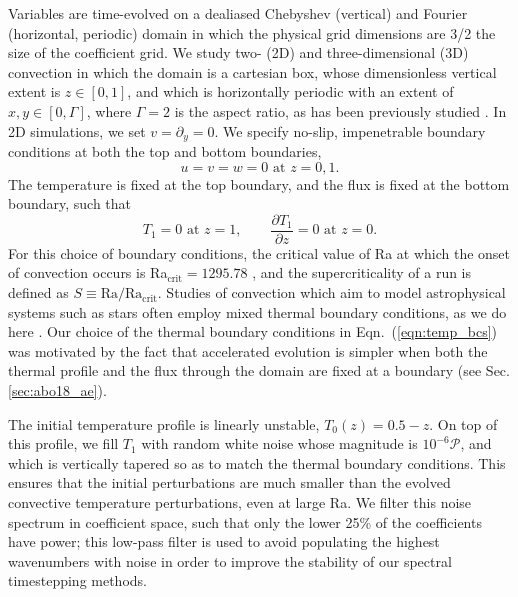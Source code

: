 Variables are time-evolved on a dealiased Chebyshev (vertical) and Fourier (horizontal, periodic) domain in which the physical grid dimensions are 3/2 the size of the coefficient grid.  
We study two- (2D) and three-dimensional (3D) convection in which the domain is a cartesian box, whose dimensionless vertical extent is $z \in [0, 1]$, and which is horizontally periodic with an extent of $x, y \in [0, \Gamma]$, where $\Gamma = 2$ is the aspect ratio, as has been previously studied \cite{goluskin&all2014, johnston&doering2009}. 
In 2D simulations, we set $v = \partial_y = 0$.
We specify no-slip, impenetrable boundary conditions at both the top and bottom boundaries,
\begin{equation}
u = v = w = 0 \, \, \text{at}\,\,z = 0,1.
\label{eqn:vel_bcs}
\end{equation}
The temperature is fixed at the top boundary, and the flux is fixed at the bottom boundary, such that
\begin{equation}
T_1 = 0 \,\,\text{at}\,\, z=1, \qquad
\frac{\partial T_1}{\partial z} = 0\,\,\text{at}\,\,z=0.
\label{eqn:temp_bcs}
\end{equation}
For this choice of boundary conditions, the critical value of Ra at which the onset of convection occurs is Ra$_{\text{crit}} = 1295.78$ \cite{goluskin2016}, and the supercriticality of a run is defined as $S \equiv \text{Ra}/\text{Ra}_{\text{crit}}$.
Studies of convection which aim to model astrophysical systems such as stars often employ mixed thermal boundary conditions, as we do here \cite{hurlburt&all1984, cattaneo&all1991, korre&all2017}.
Our choice of the thermal boundary conditions in Eqn.~(\ref{eqn:temp_bcs}) was motivated by the fact that accelerated evolution is simpler when both the thermal profile and the flux through the domain are fixed at a boundary (see Sec. \ref{sec:abo18_ae}).

The initial temperature profile is linearly unstable, $T_0(z) = 0.5 - z$. On top of this profile, we fill $T_1$ with random white noise whose magnitude is $10^{-6}\mathcal{P}$, and which is vertically tapered so as to match the thermal boundary conditions.
This ensures that the initial perturbations are much smaller than the evolved convective temperature perturbations, even at large Ra.
We filter this noise spectrum in coefficient space, such that only the lower 25\% of the coefficients have power; this low-pass filter is used to avoid populating the highest wavenumbers with noise in order to improve the stability of our spectral timestepping methods.


